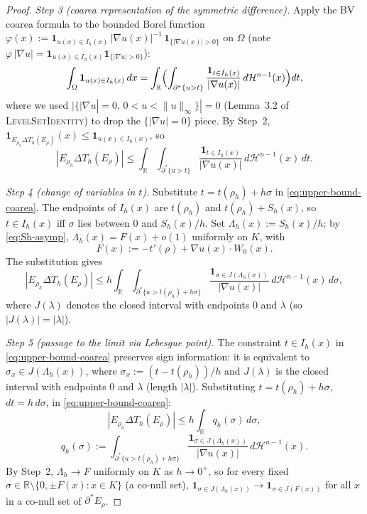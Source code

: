 \documentclass[11pt]{article}
\theoremstyle{definition}
\newcommand{\R}{\mathbb{R}}
\newcommand{\Om}{\Omega}
\newcommand{\Hn}{\mathcal H^{n-1}}
\begin{document}
\begin{proof}
\smallskip
\emph{Step 3 (coarea representation of the symmetric difference).}
Apply the BV coarea formula to the bounded Borel function
$\varphi(x):=\mathbf 1_{u(x)\in I_h(x)}\,|\nabla u(x)|^{-1}\,
\mathbf 1_{\{|\nabla u(x)|>0\}}$ on $\Om$ (note $\varphi\,|\nabla u|=
\mathbf 1_{u(x)\in I_h(x)}\mathbf 1_{\{|\nabla u|>0\}}$):
\begin{equation}\label{eq:coarea-app}
   \int_\Om\mathbf 1_{u(x)\in I_h(x)}\,dx
   =\int_{\R}\Bigl(\int_{\partial^*\{u>t\}}\frac{\mathbf 1_{t\in I_h(x)}}
    {|\nabla u(x)|}\,d\Hn(x)\Bigr)dt,
\end{equation}
where we used $|\{|\nabla u|=0,\,0<u<\|u\|_\infty\}|=0$ (Lemma~3.2 of
\textsc{LevelSetIdentity}) to drop the $\{|\nabla u|=0\}$ piece. By Step~2,
$\mathbf 1_{E_{\rho_h}\Delta T_h(E_\rho)}(x)\le\mathbf 1_{u(x)\in I_h(x)}$,
so
\begin{equation}\label{eq:upper-bound-coarea}
   |E_{\rho_h}\Delta T_h(E_\rho)|
   \le\int_\R\int_{\partial^*\{u>t\}}\frac{\mathbf 1_{t\in I_h(x)}}
   {|\nabla u(x)|}\,d\Hn(x)\,dt.
\end{equation}

\smallskip
\emph{Step 4 (change of variables in $t$).} Substitute $t=t(\rho_h)+h\sigma$
in \eqref{eq:upper-bound-coarea}. The endpoints of $I_h(x)$ are $t(\rho_h)$
and $t(\rho_h)+S_h(x)$, so $t\in I_h(x)$ iff $\sigma$ lies between $0$ and
$S_h(x)/h$. Set $\Lambda_h(x):=S_h(x)/h$; by \eqref{eq:Sh-asymp},
$\Lambda_h(x)=F(x)+o(1)$ uniformly on $K$, with
\begin{equation}\label{eq:F-def}
   F(x):=-t'(\rho)+\nabla u(x)\cdot W_0(x).
\end{equation}
The substitution gives
\begin{equation}\label{eq:after-sub}
   |E_{\rho_h}\Delta T_h(E_\rho)|
   \le h\int_\R\int_{\partial^*\{u>t(\rho_h)+h\sigma\}}
   \frac{\mathbf 1_{\sigma\in J(\Lambda_h(x))}}{|\nabla u(x)|}\,d\Hn(x)\,d\sigma,
\end{equation}
where $J(\lambda)$ denotes the closed interval with endpoints $0$ and
$\lambda$ (so $|J(\lambda)|=|\lambda|$).

\smallskip
\emph{Step 5 (passage to the limit via Lebesgue point).}
The constraint $t \in I_h(x)$ in \eqref{eq:upper-bound-coarea} preserves
sign information: it is equivalent to $\sigma_x \in J(\Lambda_h(x))$,
where $\sigma_x:=(t-t(\rho_h))/h$ and $J(\lambda)$ is the closed interval
with endpoints $0$ and $\lambda$ (length $|\lambda|$). Substituting
$t=t(\rho_h)+h\sigma$, $dt=h\,d\sigma$, in
\eqref{eq:upper-bound-coarea}:
\begin{equation}\label{eq:after-sub-final}
   |E_{\rho_h}\Delta T_h(E_\rho)|
   \le h\int_\R q_h(\sigma)\,d\sigma,
\end{equation}
\[
   q_h(\sigma):=\int_{\partial^*\{u>t(\rho_h)+h\sigma\}}
   \frac{\mathbf 1_{\sigma\in J(\Lambda_h(x))}}{|\nabla u(x)|}\,d\Hn(x).
\]
By Step~2, $\Lambda_h\to F$ uniformly on $K$ as $h\to0^+$, so for every
fixed $\sigma\in\R\setminus\{0,\pm F(x):x\in K\}$ (a co-null set),
$\mathbf 1_{\sigma\in J(\Lambda_h(x))}\to\mathbf 1_{\sigma\in J(F(x))}$ for
all $x$ in a co-null set of $\partial^*E_\rho$.


\end{proof}
\end{document}
